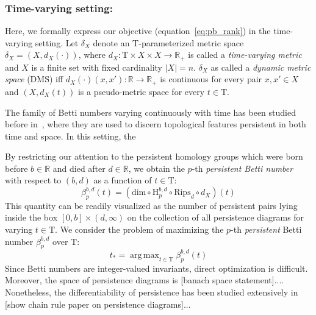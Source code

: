 \documentclass[10pt]{article}
\DeclareMathOperator*{\argmax}{arg\,max}
\begin{document}
\subsubsection*{Time-varying setting:}
Here, we formally express our objective (equation~\eqref{eq:pb_rank}) in the time-varying setting. 
Let $\delta_X$ denote an $\mathrm{T}$-parameterized metric space $\delta_X = ( X, d_X(\cdot) )$, where $d_X: \mathrm{T} \times X \times X \to \mathbb{R}_+$ is called a \emph{time-varying metric}  and $X$ is a finite set with fixed cardinality $\lvert X \rvert = n$. $\delta_X$ as called a \emph{dynamic metric space} (DMS) iff $d_X(\cdot)(x, x'): \mathbb{R} \to \mathbb{R}_{+}$ is continuous for every pair $x, x' \in X$ and $(X, d_X(t))$ is a pseudo-metric space for every $t \in \mathrm{T}$. 

The family of Betti numbers varying continuously with time has been studied before in~\cite{}, where they are used to discern topological features persistent in both time and space. In this setting, the 

By restricting our attention to the persistent homology groups which were born before $b \in \mathbb{R}$ and died after $d \in \mathbb{R}$, we obtain the $p$-th \emph{persistent Betti number} with respect to $(b,d)$ as a function of $t \in \mathrm{T}$: 
$$ \beta_{p}^{b,d}(t) = \left(\mathrm{dim} \circ \mathrm{H}_p^{b,d} \circ \mathrm{Rips}_d \circ d_X \right)(t)$$
This quantity can be readily visualized as the number of persistent pairs lying inside the box $[0, b] \times (d, \infty)$  on the collection of all persistence diagrams for varying $t \in \mathrm{T}$.
We consider the problem of maximizing the $p$-th \emph{persistent} Betti number $\beta^{b,d}_p$ over $\mathrm{T}$: 
\begin{equation}
	t_\ast = \argmax_{t \in \mathrm{T}}	 \beta_{p}^{b,d}(t)
\end{equation}
Since Betti numbers are integer-valued invariants, direct optimization is difficult. Moreover, the space of persistence diagrams is [banach space statement]....
Nonetheless, the differentiability of persistence has been studied extensively in [show chain rule paper on persistence diagrams]...


\end{document}
